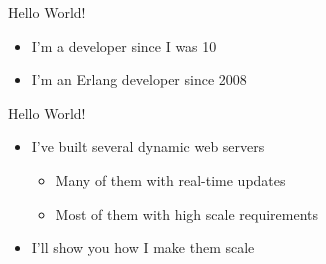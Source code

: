 \documentclass[utf8]{beamer}
\begin{document}
\begin{frame}{Hello World!}
	\begin{itemize}
		\item<+-> I'm a developer since I was 10
		\item<+-> I'm an Erlang developer since 2008
	\end{itemize}
\end{frame}
\begin{frame}{Hello World!}
	\begin{itemize}
		\item<+-> I've built several dynamic web servers
			\begin{itemize}
				\item<+-> Many of them with real-time updates
				\item<+-> Most of them with high scale requirements
			\end{itemize}
		\item<+-> I'll show you how I make them scale
	\end{itemize}
\end{frame}
\end{document}
